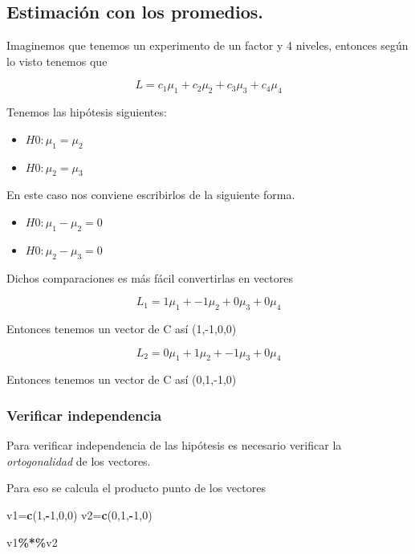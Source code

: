 \documentclass[
]{article}
\newenvironment{Shaded}{\begin{snugshade}}{\end{snugshade}}
\newcommand{\DecValTok}[1]{\textcolor[rgb]{0.00,0.00,0.81}{#1}}
\newcommand{\FunctionTok}[1]{\textcolor[rgb]{0.13,0.29,0.53}{\textbf{#1}}}
\newcommand{\NormalTok}[1]{#1}
\newcommand{\OtherTok}[1]{\textcolor[rgb]{0.56,0.35,0.01}{#1}}
\newcommand{\SpecialCharTok}[1]{\textcolor[rgb]{0.81,0.36,0.00}{\textbf{#1}}}
\providecommand{\tightlist}{%
  \setlength{\itemsep}{0pt}\setlength{\parskip}{0pt}}
\begin{document}
\subsection{Estimación con los
promedios.}\label{estimaciuxf3n-con-los-promedios.}

Imaginemos que tenemos un experimento de un factor y 4 niveles, entonces
según lo visto tenemos que

\[L=c_1\mu_1+c_2\mu_2+c_3\mu_3+c_4\mu_4\]

Tenemos las hipótesis siguientes:

\begin{itemize}
\tightlist
\item
  \(H0: \mu_1=\mu_2\)
\item
  \(H0: \mu_2=\mu_3\)
\end{itemize}

En este caso nos conviene escribirlos de la siguiente forma.

\begin{itemize}
\tightlist
\item
  \(H0: \mu_1-\mu_2=0\)
\item
  \(H0: \mu_2-\mu_3=0\)
\end{itemize}

Dichos comparaciones es más fácil convertirlas en vectores

\[L_1=1\mu_1+-1\mu_2+0\mu_3+0\mu_4\]

Entonces tenemos un vector de C así (1,-1,0,0)

\[L_2=0\mu_1+1\mu_2+-1\mu_3+0\mu_4\]

Entonces tenemos un vector de C así (0,1,-1,0)

\subsubsection{Verificar independencia}\label{verificar-independencia}

Para verificar independencia de las hipótesis es necesario verificar la
\emph{ortogonalidad} de los vectores.

Para eso se calcula el producto punto de los vectores

\begin{Shaded}
\begin{Highlighting}[]
\NormalTok{v1}\OtherTok{=}\FunctionTok{c}\NormalTok{(}\DecValTok{1}\NormalTok{,}\SpecialCharTok{{-}}\DecValTok{1}\NormalTok{,}\DecValTok{0}\NormalTok{,}\DecValTok{0}\NormalTok{)}
\NormalTok{v2}\OtherTok{=}\FunctionTok{c}\NormalTok{(}\DecValTok{0}\NormalTok{,}\DecValTok{1}\NormalTok{,}\SpecialCharTok{{-}}\DecValTok{1}\NormalTok{,}\DecValTok{0}\NormalTok{)}

\NormalTok{v1}\SpecialCharTok{\%*\%}\NormalTok{v2}
\end{Highlighting}
\end{Shaded}
\end{document}
